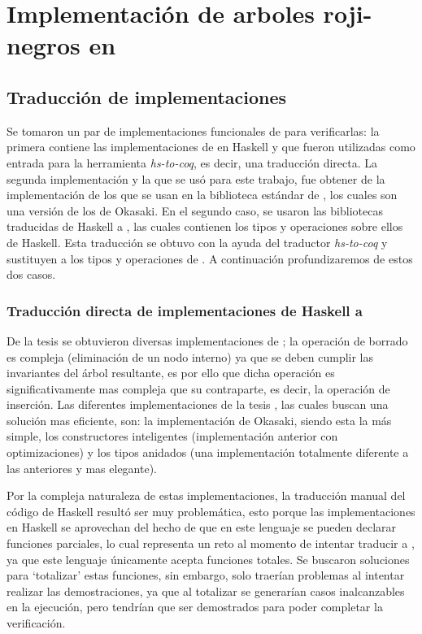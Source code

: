 \chapter{Implementación de arboles roji-negros en {\coq}}

\section{Traducción de implementaciones}
Se tomaron un par de implementaciones funcionales de {\arns} para verificarlas: la primera contiene las
implementaciones de \cite{tesisG} en Haskell y que fueron utilizadas como entrada para la
herramienta \textit{hs-to-coq}, es decir, una traducci\'on directa. La segunda implementaci\'on y la que
se us\'o para este trabajo, fue obtener de \cite{MSetRBT} la implementaci\'on de los {\arns} que se
usan en la biblioteca estándar de {\coq}, los cuales son una versi\'on de los {\arns} de Okasaki\cite{Okasaki}. En el segundo caso, se usaron
las bibliotecas traducidas de Haskell a {\coq}, las cuales contienen los tipos y operaciones sobre ellos de Haskell.
Esta traducción se obtuvo con la ayuda del traductor \textit{hs-to-coq} y
sustituyen a los tipos y operaciones de {\coq}. A continuación profundizaremos de estos 
dos casos.

\subsection{Traducción directa de implementaciones de Haskell a {\coq}}
De la tesis \cite{tesisG} se obtuvieron diversas implementaciones de {\arns}; la operaci\'on de borrado es compleja (eliminaci\'on de un nodo interno) ya que se deben cumplir las invariantes del \'arbol resultante, es por ello que dicha operación es
significativamente mas compleja que su contraparte, es decir, la operación de inserci\'on. Las diferentes 
implementaciones de la tesis \cite{tesisG}, las cuales buscan una soluci\'on mas eficiente, son: la implementación de Okasaki, siendo esta la m\'as simple,
los constructores inteligentes (implementaci\'on anterior con optimizaciones) y los 
tipos anidados (una implementaci\'on totalmente diferente a las anteriores y mas elegante).

Por la compleja naturaleza de estas implementaciones, la traducción
manual del código de Haskell result\'o ser muy problemática, esto porque las implementaciones en
Haskell se aprovechan del hecho de que en este lenguaje se pueden declarar funciones parciales, lo
cual representa un reto al momento de intentar traducir a {\coq}, ya que este lenguaje únicamente 
acepta funciones totales. Se buscaron soluciones para `totalizar' estas funciones, sin embargo,
solo traerían problemas al intentar realizar las demostraciones, ya que al totalizar se generar\'ian 
casos inalcanzables en la ejecuci\'on, pero tendrían que ser demostrados para poder completar la verificaci\'on.

